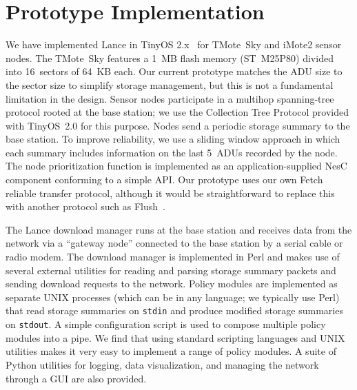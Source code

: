 \section{Prototype Implementation}
\label{lance-sec-implementation}
\label{lance-sec-implementation-nsm}

We have implemented Lance in TinyOS 2.x~\cite{tinyos-asplos00} for 
TMote~Sky and iMote2 sensor nodes. The TMote~Sky features a
1~MB flash memory (ST~M25P80) divided into 16~sectors of 64~KB each.
Our current prototype matches the ADU size to the sector size to
simplify storage management, but this is not a fundamental limitation
in the design. Sensor nodes participate in a multihop spanning-tree 
protocol rooted
at the base station; we use the Collection Tree Protocol provided with
TinyOS~2.0 for this purpose. Nodes send a periodic storage summary to the
base station. To improve reliability, we use a
sliding window approach in which each summary includes information on
the last 5~ADUs recorded by the node. The node prioritization function
is implemented as an application-supplied NesC component conforming to
a simple API. Our prototype uses our own Fetch~\cite{volcano-osdi06}
reliable transfer protocol, although it would be straightforward to
replace this with another protocol such as Flush~\cite{flush-sensys07}.

The Lance download manager runs at the base station and receives
data from the network via a ``gateway node'' connected to the base
station by a serial cable or radio modem.  The download manager is 
implemented in Perl and makes use of several external utilities for
reading and parsing storage summary packets and sending download
requests to the network. Policy modules are implemented as separate
UNIX processes (which can be in any language; we typically use Perl) 
that read storage summaries on {\tt stdin} and produce modified
storage summaries on {\tt stdout}. A simple configuration script is
used to compose multiple policy modules into a pipe. We find that
using standard scripting languages and UNIX utilities makes it very
easy to implement a range of policy modules.
A suite of Python utilities for logging, data visualization, and 
managing the network through a GUI are also provided.

